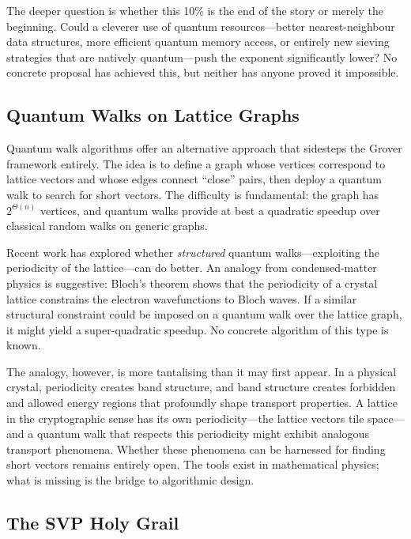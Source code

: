 The deeper question is whether this 10\% is the end of the story or merely the beginning.  Could a cleverer use of quantum resources---better nearest-neighbour data structures, more efficient quantum memory access, or entirely new sieving strategies that are natively quantum---push the exponent significantly lower?  No concrete proposal has achieved this, but neither has anyone proved it impossible.

\subsection{Quantum Walks on Lattice Graphs}
\label{subsec:quantum-walks}

Quantum walk algorithms offer an alternative approach that sidesteps the Grover framework entirely.  The idea is to define a graph whose vertices correspond to lattice vectors and whose edges connect ``close'' pairs, then deploy a quantum walk to search for short vectors.  The difficulty is fundamental: the graph has $2^{\Theta(n)}$ vertices, and quantum walks provide at best a quadratic speedup over classical random walks on generic graphs.

Recent work has explored whether \emph{structured} quantum walks---exploiting the periodicity of the lattice---can do better.  An analogy from condensed-matter physics is suggestive: Bloch's theorem shows that the periodicity of a crystal lattice constrains the electron wavefunctions to Bloch waves.  If a similar structural constraint could be imposed on a quantum walk over the lattice graph, it might yield a super-quadratic speedup.  No concrete algorithm of this type is known.

The analogy, however, is more tantalising than it may first appear.  In a physical crystal, periodicity creates band structure, and band structure creates forbidden and allowed energy regions that profoundly shape transport properties.  A lattice in the cryptographic sense has its own periodicity---the lattice vectors tile space---and a quantum walk that respects this periodicity might exhibit analogous transport phenomena.  Whether these phenomena can be harnessed for finding short vectors remains entirely open.  The tools exist in mathematical physics; what is missing is the bridge to algorithmic design.

\subsection{The SVP Holy Grail}
\label{subsec:svp-holy-grail}

